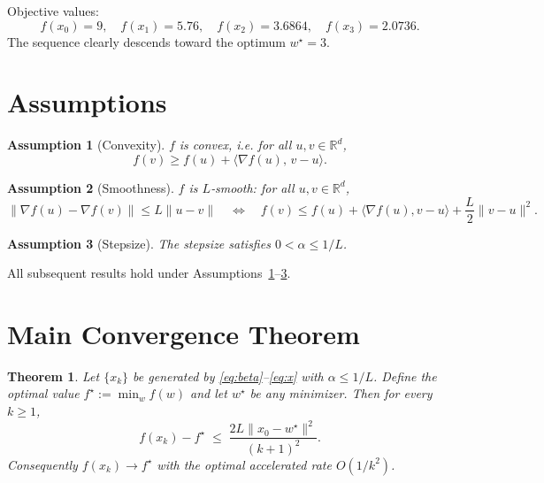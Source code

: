\documentclass{article}
\newtheorem{theorem}{Theorem}
\newtheorem{assumption}{Assumption}
\newcommand{\grad}{\nabla}
\newcommand{\R}{\mathbb{R}}
\begin{document}
Objective values:
\[
f(x_0)=9,\quad f(x_1)=5.76,\quad f(x_2)=3.6864,\quad f(x_3)=2.0736.
\]
The sequence clearly descends toward the optimum $w^\star=3$.

\section*{Assumptions}
\begin{assumption}[Convexity]\label{ass:convex}
$f$ is convex, i.e. for all $u,v\in\R^d$,
\[
f(v)\ge f(u)+\langle \grad f(u),\,v-u\rangle .
\]
\end{assumption}
\begin{assumption}[Smoothness]\label{ass:smooth}
$f$ is $L$‑smooth: for all $u,v\in\R^d$,
\[
\|\grad f(u)-\grad f(v)\|\le L\|u-v\|
\quad\Longleftrightarrow\quad
f(v)\le f(u)+\langle\grad f(u),v-u\rangle+\frac{L}{2}\|v-u\|^2 .
\]
\end{assumption}
\begin{assumption}[Stepsize]\label{ass:step}
The stepsize satisfies $0<\alpha\le 1/L$.
\end{assumption}
All subsequent results hold under Assumptions~\ref{ass:convex}--\ref{ass:step}.

\section*{Main Convergence Theorem}
\begin{theorem}\label{thm:rate}
Let $\{x_k\}$ be generated by \eqref{eq:beta}--\eqref{eq:x} with $\alpha\le 1/L$.
Define the optimal value $f^\star:=\min_{w}f(w)$ and let $w^\star$ be any minimizer.
Then for every $k\ge 1$,
\[
f(x_k)-f^\star \;\le\; \frac{2L\|x_0-w^\star\|^2}{(k+1)^2}.
\tag{T1}
\]
Consequently $f(x_k)\to f^\star$ with the optimal accelerated rate $O(1/k^2)$.
\end{theorem}
\end{document}
